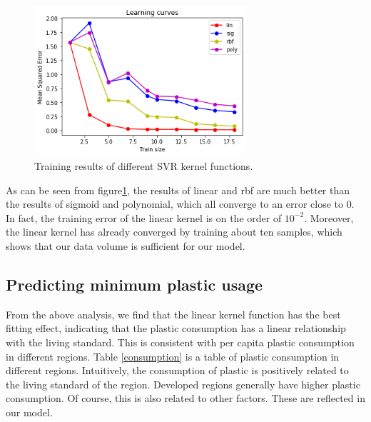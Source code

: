 \documentclass{mcmthesis}
\begin{document}
\begin{figure}[!htb] %
	\centering %
	\includegraphics[width=0.7\textwidth]{figures/learncurve.png} %
	\caption{Training results of different SVR kernel functions.} %
	\label{fig1} %
	
\end{figure}

As can be seen from figure\ref{fig1}, the results of linear and rbf are much better than the results of sigmoid and polynomial, which all converge to an error close to 0. In fact, the training error of the linear kernel is on the order of $10^{-2}$. Moreover, the linear kernel has already converged by training about ten samples, which shows that our data volume is sufficient for our model.

\subsection{Predicting minimum plastic usage}

From the above analysis, we find that the linear kernel function has the best fitting effect, indicating that the plastic consumption has a linear relationship with the living standard. This is consistent with per capita plastic consumption in different regions. Table \ref{consumption} is a table of plastic consumption in different regions. Intuitively, the consumption of plastic is positively related to the living standard of the region. Developed regions generally have higher plastic consumption. Of course, this is also related to other factors. These are reflected in our model.
\end{document}
